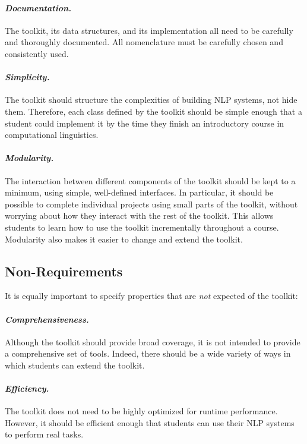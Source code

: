 \documentclass{article}
\begin{document}
\paragraph{\textit{Documentation.}} The toolkit, its data structures,
and its implementation all need to be carefully and thoroughly
documented.  All nomenclature must be carefully chosen and
consistently used.

\paragraph{\textit{Simplicity.}} The toolkit should structure the
complexities of building NLP systems, not hide them.  Therefore, each
class defined by the toolkit should be simple enough that a student
could implement it by the time they finish an introductory course in
computational linguistics.

\paragraph{\textit{Modularity.}} The interaction between different
components of the toolkit should be kept to a minimum, using simple,
well-defined interfaces.  In particular, it should be possible to
complete individual projects using small parts of the toolkit, without
worrying about how they interact with the rest of the toolkit.  This
allows students to learn how to use the toolkit incrementally
throughout a course.  Modularity also makes it easier to change and
extend the toolkit.

\subsection{Non-Requirements}

It is equally important to specify properties that are \emph{not}
expected of the toolkit:

\paragraph{\textit{Comprehensiveness.}} Although the toolkit should
provide broad coverage, it is not intended to provide a comprehensive
set of tools.  Indeed, there should be a wide variety of ways in which
students can extend the toolkit.

\paragraph{\textit{Efficiency.}} The toolkit does not need to be highly
optimized for runtime performance.  However, it should be efficient
enough that students can use their NLP systems to perform real tasks.
\end{document}
